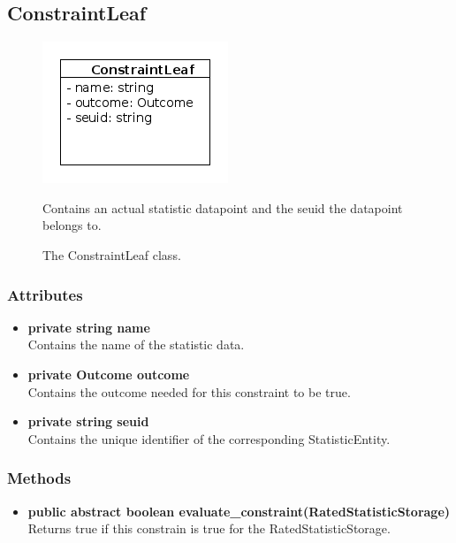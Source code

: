 \subsection{ConstraintLeaf}
\begin{figure}[htbp]
	\begin{minipage}[t]{8cm}
		\vspace{0pt}
		\centering
		\includegraphics[scale=0.6]{./diagram_pictures/reactor/ConstraintLeaf.png}
		\caption{The ConstraintLeaf class.}
	\end{minipage}
	\hfill
	\begin{minipage}[t]{8cm}
		\vspace{10pt}
			Contains an actual statistic datapoint and the seuid the datapoint belongs to.
	\end{minipage}
\end{figure}  

\subsubsection{Attributes}
\begin{itemize}
	\item \textbf{ private string name }\\
	Contains the name of the statistic data.
	\item \textbf{ private Outcome outcome }\\
	Contains the outcome needed for this constraint to be true.
	\item \textbf{ private string seuid }\\
	Contains the unique identifier of the corresponding StatisticEntity.
\end{itemize}
\subsubsection{Methods}
\begin{itemize}
	\item \textbf{ public abstract boolean evaluate\_constraint(RatedStatisticStorage) }\\
	Returns true if this constrain is true for the RatedStatisticStorage.
\end{itemize}


